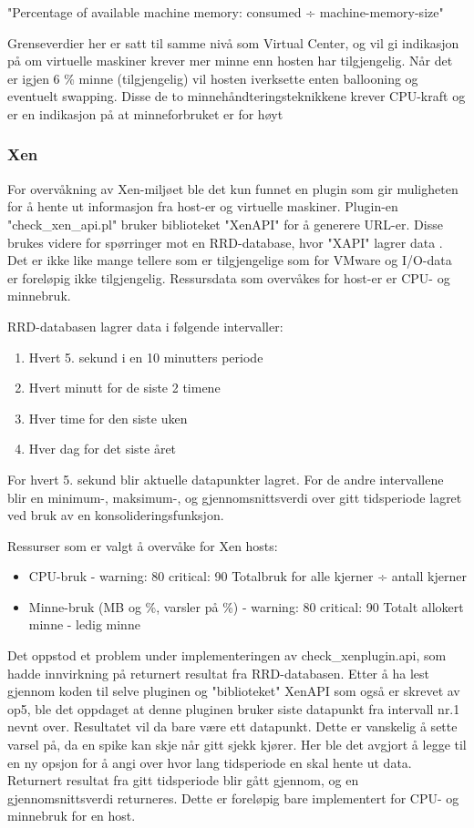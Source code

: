 "Percentage of available machine memory: consumed ÷ machine-memory-size"

Grenseverdier her er satt til samme nivå som Virtual Center, og vil gi indikasjon på om virtuelle maskiner krever mer minne enn hosten har tilgjengelig. Når det er igjen 6 \% minne (tilgjengelig) vil hosten iverksette enten ballooning og eventuelt swapping. Disse de to minnehåndteringsteknikkene krever CPU-kraft og er en indikasjon på at minneforbruket er for høyt

\subsubsection{Xen}

For overvåkning av Xen-miljøet ble det kun funnet en plugin som gir muligheten for å hente ut informasjon fra host-er og virtuelle maskiner. Plugin-en "check\_xen\_api.pl" bruker biblioteket "XenAPI" for å generere URL-er. Disse brukes videre for spørringer mot en RRD-database, hvor "XAPI" lagrer data \cite{xenwiki}. Det er ikke like mange tellere som er tilgjengelige som for VMware og I/O-data er foreløpig ikke tilgjengelig. Ressursdata som overvåkes for host-er er CPU- og minnebruk.

RRD-databasen lagrer data i følgende intervaller:
\begin{enumerate}
	\item Hvert 5. sekund i en 10 minutters periode
	\item Hvert minutt for de siste 2 timene
	\item Hver time for den siste uken
	\item Hver dag for det siste året
\end{enumerate}

For hvert 5. sekund blir aktuelle datapunkter lagret. For de andre intervallene blir en minimum-, maksimum-, og gjennomsnittsverdi over gitt tidsperiode lagret ved bruk av en konsolideringsfunksjon. %

Ressurser som er valgt å overvåke for Xen hosts:

\begin{itemize}
\item CPU-bruk - warning: 80 critical: 90 Totalbruk for alle kjerner ÷ antall kjerner
\item Minne-bruk (MB og \%, varsler på \%) - warning: 80 critical: 90 Totalt allokert minne - ledig minne 
\end{itemize}

Det oppstod et problem under implementeringen av check\_xenplugin.api, som hadde innvirkning på returnert resultat fra RRD-databasen. Etter å ha lest gjennom koden til selve pluginen og "biblioteket" XenAPI som også er skrevet av op5, ble det oppdaget at denne pluginen bruker siste datapunkt fra intervall nr.1 nevnt over. Resultatet vil da bare være ett datapunkt. Dette er vanskelig å sette varsel på, da en spike kan skje når gitt sjekk kjører. Her ble det avgjort å legge til en ny opsjon for å angi over hvor lang tidsperiode en skal hente ut data. Returnert resultat fra gitt tidsperiode blir gått gjennom, og en gjennomsnittsverdi returneres. Dette er foreløpig bare implementert for CPU- og minnebruk for en host.

